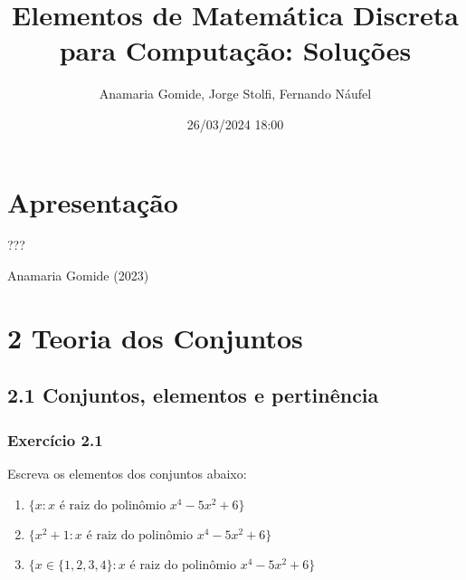 \documentclass[
  letterpaper,
  DIV=11,
  numbers=noendperiod]{scrreprt}
\title{Elementos de Matemática Discreta para Computação: Soluções}
\author{Anamaria Gomide, Jorge Stolfi, Fernando Náufel}
\date{26/03/2024 18:00}
\renewcommand*\contentsname{Índice}
\newcommand\contentsname{Índice}
\begin{document}
\maketitle

\makeatletter
{}
{}
{}
\makeatother


\renewcommand*\contentsname{Índice}
{
\hypersetup{linkcolor=}
\setcounter{tocdepth}{2}
\tableofcontents
}

\chapter*{Apresentação}\label{apresentauxe7uxe3o}


???

Anamaria Gomide (2023)


\chapter*{2 Teoria dos Conjuntos}\label{teoria-dos-conjuntos}


\section*{2.1 Conjuntos, elementos e
pertinência}\label{conjuntos-elementos-e-pertinuxeancia}


\subsection*{Exercício 2.1}\label{exr-2-1}

Escreva os elementos dos conjuntos abaixo:

\begin{enumerate}
\def\labelenumi{\alph{enumi})}
\item
  $\{ x : x \text{ é raiz do polinômio } x^4 - 5x^2 + 6 \}$
\item
  $\{ x^2 + 1 : x \text{ é raiz do polinômio } x^4 - 5x^2 + 6 \}$
\item
  $\{ x \in \{1, 2, 3, 4\} : x \text{ é raiz do polinômio } x^4 - 5x^2 + 6 \}$
\end{enumerate}
\end{document}
